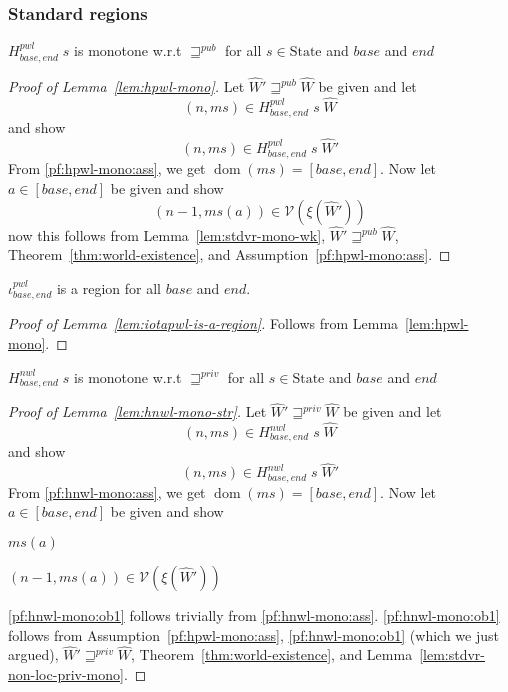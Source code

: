 \documentclass[a4paper]{article}
\DeclareMathOperator{\dom}{dom}
\newcommand{\var}[1]{\mathit{#1}}
\newcommand{\hs}{\var{ms}}
\newcommand{\ms}{\hs}
\newcommand{\addr}{\var{a}}
\newcommand{\start}{\var{base}}
\newcommand{\addrend}{\var{end}}
\newcommand{\nwl}{\var{nwl}}
\newcommand{\pwl}{\var{pwl}}
\newcommand{\futurewk}{\mathbin{\sqsupseteq}^{\var{pub}}}
\newcommand{\futurestr}{\mathbin{\sqsupseteq}^{\var{priv}}}
\newcommand{\asmType}{\plaindom{AsmType}}
\newcommand{\plaindom}[1]{\mathrm{#1}}
\newcommand{\States}{\plaindom{State}}
\newcommand{\intr}[2]{\mathcal{#1}}
\newcommand{\valueintr}[1]{\intr{V}{#1}}
\newcommand{\stdvr}{\valueintr{\asmType}}
\newcommand{\npair}[2][n]{\left(#1,#2 \right)}
\newcommand{\nonlocal}[1]{\ensuremath{#1} \text{ is non-local}}
\begin{document}
\subsubsection{Standard regions}

\begin{lemma}
  \label{lem:hpwl-mono}
  $H^\pwl_{\start,\addrend} \; s$ is monotone w.r.t $\futurewk$ for all $s \in \States$ and $\start$ and $\addrend$
\end{lemma}
\begin{proof}[Proof of Lemma~\ref{lem:hpwl-mono}]
  Let $\hat{W}' \futurewk \hat{W}$ be given and let 
  \begin{equation}
    \label{pf:hpwl-mono:ass}
    \npair{\ms} \in H^\pwl_{\start,\addrend}\; s \; \hat{W}
  \end{equation}
  and show
  \[
    \npair{\ms} \in H^\pwl_{\start,\addrend}\; s \; \hat{W}'
  \]
  From \ref{pf:hpwl-mono:ass}, we get $\dom(\ms) = [\start,\addrend]$. Now let $\addr \in [\start,\addrend]$ be given and show
  \[
    \npair[n-1]{\ms(a)} \in \stdvr(\xi(\hat{W}'))
  \]
  now this follows from Lemma~\ref{lem:stdvr-mono-wk}, $\hat{W}' \futurewk \hat{W}$, Theorem~\ref{thm:world-existence}, and Assumption~\ref{pf:hpwl-mono:ass}.
\end{proof}

\begin{lemma}
  \label{lem:iotapwl-is-a-region}
  $\iota^\pwl_{\start,\addrend}$ is a region for all $\start$ and $\addrend$.
\end{lemma}
\begin{proof}[Proof of Lemma~\ref{lem:iotapwl-is-a-region}]
  Follows from Lemma~\ref{lem:hpwl-mono}.
\end{proof}

\begin{lemma}
  \label{lem:hnwl-mono-str}
  $H^\nwl_{\start,\addrend} \; s$ is monotone w.r.t $\futurestr$ for all $s \in \States$ and $\start$ and $\addrend$
\end{lemma}
\begin{proof}[Proof of Lemma~\ref{lem:hnwl-mono-str}]
  Let $\hat{W}' \futurestr \hat{W}$ be given and let 
  \begin{equation}
    \label{pf:hnwl-mono:ass}
    \npair{\ms} \in H^\nwl_{\start,\addrend}\; s \; \hat{W}
  \end{equation}
  and show
  \[
    \npair{\ms} \in H^\nwl_{\start,\addrend}\; s \; \hat{W}'
  \]
  From \ref{pf:hnwl-mono:ass}, we get $\dom(\ms) = [\start,\addrend]$. Now let $\addr \in [\start,\addrend]$ be given and show
  \begin{enumproof}
    \item \nonlocal{\ms(a)} \label{pf:hnwl-mono:ob1}
    \item $\npair[n-1]{\ms(a)} \in \stdvr(\xi(\hat{W}'))$ \label{pf:hnwl-mono:ob2}
  \end{enumproof}
  \ref{pf:hnwl-mono:ob1} follows trivially from \ref{pf:hnwl-mono:ass}. \ref{pf:hnwl-mono:ob1} follows from Assumption~\ref{pf:hpwl-mono:ass}, \ref{pf:hnwl-mono:ob1} (which we just argued), $\hat{W}' \futurestr \hat{W}$, Theorem~\ref{thm:world-existence}, and Lemma~\ref{lem:stdvr-non-loc-priv-mono}.
\end{proof}
\end{document}
